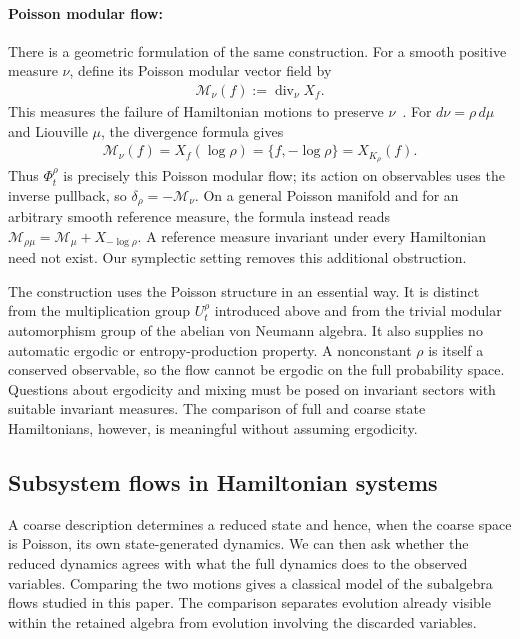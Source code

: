 \documentclass[a4paper,11pt]{article}
\theoremstyle{definition}
\begin{document}
\paragraph{Poisson modular flow:}
There is a geometric formulation of the same construction. For a smooth positive measure $\nu$, define its Poisson modular vector field by
\begin{align}
    \mathcal M_\nu(f):=\operatorname{div}_\nu X_f.
\end{align}
This measures the failure of Hamiltonian motions to preserve $\nu$~\cite{Weinstein1997}. For $d\nu=\rho\,d\mu$ and Liouville $\mu$, the divergence formula gives
\begin{align}
    \mathcal M_\nu(f)=X_f(\log\rho)
    =\{f,-\log\rho\}=X_{K_\rho}(f).
\end{align}
Thus $\Phi_t^\rho$ is precisely this Poisson modular flow; its action on observables uses the inverse pullback, so $\delta_\rho=-\mathcal M_\nu$. On a general Poisson manifold and for an arbitrary smooth reference measure, the formula instead reads $\mathcal M_{\rho\mu}=\mathcal M_\mu+X_{-\log\rho}$. A reference measure invariant under every Hamiltonian need not exist. Our symplectic setting removes this additional obstruction.

The construction uses the Poisson structure in an essential way. It is distinct from the multiplication group $U_t^\rho$ introduced above and from the trivial modular automorphism group of the abelian von Neumann algebra. It also supplies no automatic ergodic or entropy-production property. A nonconstant $\rho$ is itself a conserved observable, so the flow cannot be ergodic on the full probability space. Questions about ergodicity and mixing must be posed on invariant sectors with suitable invariant measures. The comparison of full and coarse state Hamiltonians, however, is meaningful without assuming ergodicity.

\subsection{Subsystem flows in Hamiltonian systems}
\label{subsec:classical-subalgebra-Hamiltonian}

A coarse description determines a reduced state and hence, when the coarse space is Poisson, its own state-generated dynamics. We can then ask whether the reduced dynamics agrees with what the full dynamics does to the observed variables. Comparing the two motions gives a classical model of the subalgebra flows studied in this paper. The comparison separates evolution already visible within the retained algebra from evolution involving the discarded variables.
\end{document}
